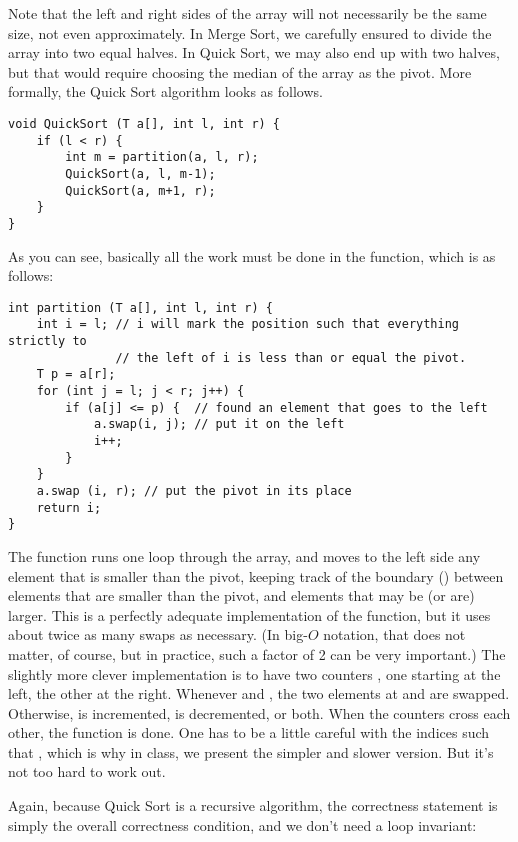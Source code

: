 Note that the left and right sides of the array will not necessarily
be the same size, not even approximately. In Merge Sort, we carefully
ensured to divide the array into two equal halves.
In Quick Sort, we may also end up with two halves, but that would
require choosing the median of the array as the pivot.
More formally, the Quick Sort algorithm looks as follows. 

\begin{verbatim}
void QuickSort (T a[], int l, int r) {
    if (l < r) {
        int m = partition(a, l, r);
        QuickSort(a, l, m-1);
        QuickSort(a, m+1, r);
    }
}
\end{verbatim}

As you can see, basically all the work must be done in the
 function, which is as follows:

\begin{verbatim}
int partition (T a[], int l, int r) {
    int i = l; // i will mark the position such that everything strictly to 
               // the left of i is less than or equal the pivot.
    T p = a[r];
    for (int j = l; j < r; j++) {
        if (a[j] <= p) {  // found an element that goes to the left
            a.swap(i, j); // put it on the left
            i++;
        }
    }
    a.swap (i, r); // put the pivot in its place
    return i;
}
\end{verbatim}

The  function runs one loop through the array, and
moves to the left side any element that is smaller than the pivot,
keeping track of the boundary () between elements that are
smaller than the pivot, and elements that may be (or are) larger.
This is a perfectly adequate implementation of the 
function, but it uses about twice as many swaps as necessary.
(In big-$O$ notation, that does not matter, of course, but in
practice, such a factor of 2 can be very important.)
The slightly more clever implementation is to have two counters
, one starting at the left, the other at the right. 
Whenever  and , the two elements at
 and  are swapped. Otherwise,  is incremented,
 is decremented, or both. When the counters cross each other,
the function is done. One has to be a little careful with the indices
 such that , which is why in class, we
present the simpler and slower version. But it's not too hard to
work out.

Again, because Quick Sort is a recursive algorithm, the correctness
statement is simply the overall correctness condition, and we don't
need a loop invariant:

